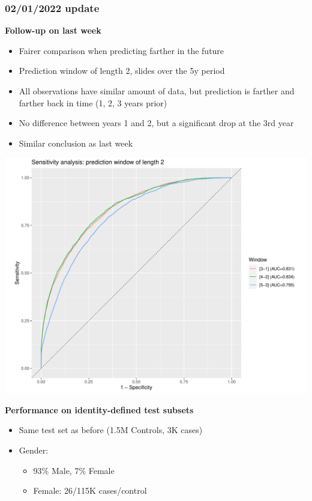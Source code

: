 \documentclass[12pt]{article}
\begin{document}
\pagebreak
\subsubsection*{02/01/2022 update}

\textbf{Follow-up on last week}
\begin{itemize}
	\item Fairer comparison when predicting farther in the future
	\item Prediction window of length 2, slides over the 5y period
	\item All observations have similar amount of data, but prediction
	is farther and farther back in time (1, 2, 3 years prior)
	\item No difference between years 1 and 2, but a significant drop at the 3rd year
	\item Similar conclusion as last week
\end{itemize}



\begin{center}
\includegraphics[width=\textwidth]{sensitivity_window/roc_curves_2.pdf}
\end{center}


\newpage
\textbf{Performance on identity-defined test subsets}
\begin{itemize}
	\item Same test set as before (1.5M Controls, 3K cases)
	\item Gender: 
	\begin{itemize}
		\item 93\% Male, 7\% Female
		\item Female: 26/115K cases/control
	\end{itemize}
\end{itemize}
\end{document}
